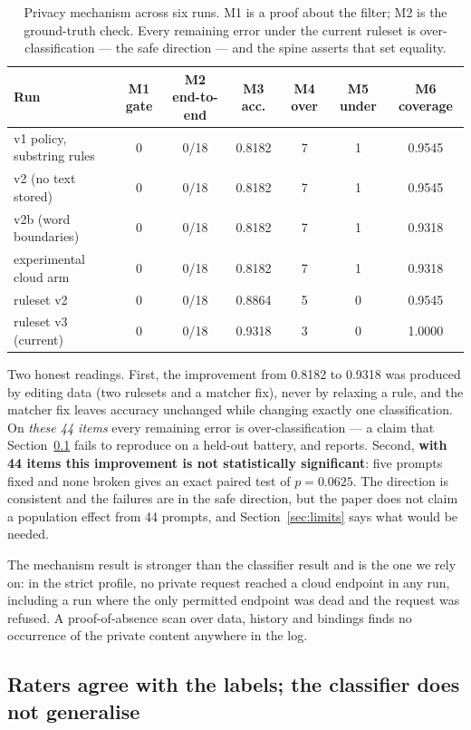 \documentclass[11pt]{article}
\begin{document}
\begin{table}[h]
\centering
\small
\begin{tabular}{@{}lcccccc@{}}
\toprule
Run & M1 gate & M2 end-to-end & M3 acc. & M4 over & M5 under & M6 coverage \\
\midrule
v1 policy, substring rules    & 0 & 0/18 & 0.8182 & 7 & 1 & 0.9545 \\
v2 (no text stored)           & 0 & 0/18 & 0.8182 & 7 & 1 & 0.9545 \\
v2b (word boundaries)         & 0 & 0/18 & 0.8182 & 7 & 1 & 0.9318 \\
experimental cloud arm        & 0 & 0/18 & 0.8182 & 7 & 1 & 0.9318 \\
ruleset v2                    & 0 & 0/18 & 0.8864 & 5 & 0 & 0.9545 \\
ruleset v3 (current)          & 0 & 0/18 & 0.9318 & 3 & 0 & 1.0000 \\
\bottomrule
\end{tabular}
\caption{Privacy mechanism across six runs. M1 is a proof about the filter; M2 is the
ground-truth check. Every remaining error under the current ruleset is
over-classification --- the safe direction --- and the spine asserts that set equality.}
\end{table}

Two honest readings. First, the improvement from 0.8182 to 0.9318 was produced by editing data
(two rulesets and a matcher fix), never by relaxing a rule, and the matcher fix leaves accuracy
unchanged while changing exactly one classification. On \emph{these 44 items} every remaining
error is over-classification --- a claim that Section~\ref{sec:annotator} fails to reproduce on a
held-out battery, and reports. Second, \textbf{with 44 items this
improvement is not statistically significant}: five prompts fixed and none broken gives an exact
paired test of $p = 0.0625$. The direction is consistent and the failures are in the safe
direction, but the paper does not claim a population effect from 44 prompts, and
Section~\ref{sec:limits} says what would be needed.

The mechanism result is stronger than the classifier result and is the one we rely on: in the
strict profile, no private request reached a cloud endpoint in any run, including a run where the
only permitted endpoint was dead and the request was refused. A proof-of-absence scan over data,
history and bindings finds no occurrence of the private content anywhere in the log.

\subsection{Raters agree with the labels; the classifier does not generalise}
\label{sec:annotator}
\end{document}
